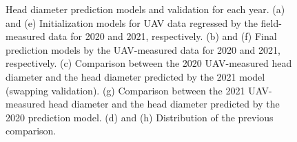 \begin{figure}[htb]
  \begin{center}
  \end{center}
  \caption[Head diameter prediction models and validation for each year.]{
    Head diameter prediction models and validation for each year. 
    (a) and (e) Initialization models for UAV data regressed by the field-measured data for 2020 and 2021, respectively. 
    (b) and (f) Final prediction models by the UAV-measured data for 2020 and 2021, respectively. 
    (c) Comparison between the 2020 UAV-measured head diameter and the head diameter predicted by the 2021 model (swapping validation). 
    (g) Comparison between the 2021 UAV-measured head diameter and the head diameter predicted by the 2020 prediction model. 
    (d) and (h) Distribution of the previous comparison.
  }
  \label{fig:cp4.2}
\end{figure}
